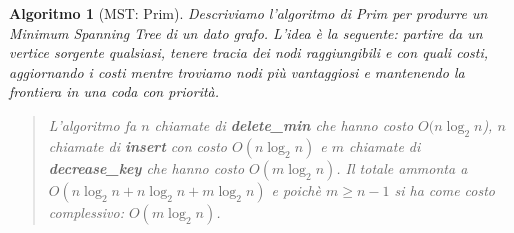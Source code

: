 \documentclass[oneside]{book}
\newtheorem{alg}{Algoritmo}
\begin{document}
\begin{alg}[MST: Prim]
  Descriviamo l'algoritmo di Prim per produrre un Minimum Spanning Tree di
  un dato grafo. L'idea \`e la seguente: partire da un vertice sorgente qualsiasi,
  tenere tracia dei nodi raggiungibili e con quali costi, aggiornando i costi mentre
  troviamo nodi pi\`u vantaggiosi e mantenendo la frontiera in una coda con priorit\`a.

  \begin{algorithm}[H]
  \end{algorithm}
  \begin{quote}
    L'algoritmo fa $n$ chiamate di \textbf{delete\_min} che hanno costo $O(n \log_2 n$),
    $n$ chiamate di \textbf{insert} con costo $O(n \log_2 n)$ e  $m$ chiamate di
    \textbf{decrease\_key} che hanno costo $O(m \log_2 n)$. Il totale ammonta a
    $O(n \log_2 n + n \log_2 n + m \log_2 n)$ e poich\`e $m \geq n-1$ si ha come
    costo complessivo: $O(m \log_2 n)$.
  \end{quote}
\end{alg}

\pagebreak
\end{document}
